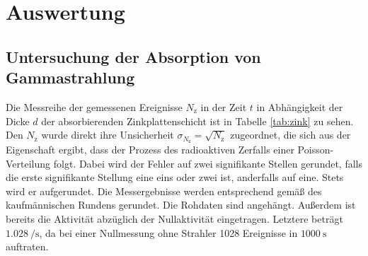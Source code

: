 \section{Auswertung}
\label{sec:Auswertung}

\subsection{Untersuchung der Absorption von Gammastrahlung}
\label{subsec:auswertunggamma}

Die Messreihe der gemessenen Ereignisse $N_\text{z}$ in der Zeit $t$ in Abhängigkeit der
Dicke $d$ der absorbierenden Zinkplattenschicht ist in Tabelle \ref{tab:zink} zu sehen.
Den $N_\text{z}$ wurde direkt ihre Unsicherheit $\sigma_{N_\mathrm{z}} = \sqrt{N_\mathrm{z}}$
zugeordnet, die sich aus der Eigenschaft ergibt, dass der Prozess des radioaktiven Zerfalls
einer Poisson-Verteilung folgt. Dabei wird der Fehler auf zwei signifikante Stellen
gerundet, falls die erste signifikante Stellung eine eins oder zwei ist, anderfalls auf eine.
Stets wird er aufgerundet. Die Messergebnisse werden entsprechend gemäß des kaufmännischen
Rundens gerundet. Die Rohdaten sind angehängt.
Außerdem ist bereits die Aktivität abzüglich der Nullaktivität eingetragen.
Letztere beträgt $\SI{1.028}{\per\second}$, da bei einer Nullmessung ohne Strahler
1028 Ereignisse in $\SI{1000}{\second}$ auftraten.

